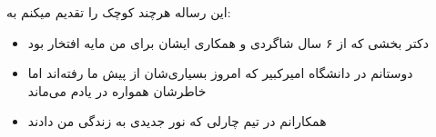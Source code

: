 \begin{acknowledgementpage}

\vspace{1.5cm}

{\nastaliq
{
    این رساله هرچند کوچک را تقدیم میکنم به:

    \begin{itemize}
        \item دکتر بخشی که از ۶ سال شاگردی و همکاری ایشان برای من مایه افتخار بود
        \item دوستانم در دانشگاه امیرکبیر که امروز بسیاری‌شان از پیش ما رفته‌اند اما خاطرشان همواره در یادم می‌ماند
        \item همکارانم در تیم چارلی که نور جدیدی به زندگی من دادند
    \end{itemize}
}}\end{acknowledgementpage}
\newpage